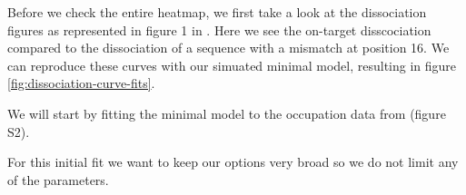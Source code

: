 Before we check the entire heatmap, we first take a look at the dissociation figures as represented in figure 1 in \cite{PNAS}. Here we see the on-target disscociation compared to the dissociation of a sequence with a mismatch at position 16. We can reproduce these curves with our simuated minimal model, resulting in figure \ref{fig:dissociation-curve-fits}.




We will start by fitting the minimal model to the occupation data from \cite{PNAS} (figure S2).

For this initial fit we want to keep our options very broad so we do not limit any of the parameters. 
